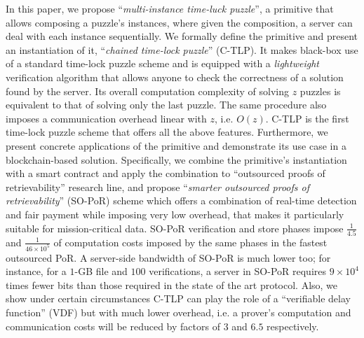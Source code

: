 In this paper, we propose  ``\emph{multi-instance time-luck puzzle}'', a primitive that allows composing a puzzle's instances, where given the composition, a server can deal with each instance sequentially. We formally define the primitive and  present an instantiation of it,  ``\emph{chained  time-lock puzzle}'' (C-TLP).  It makes black-box use of a standard time-lock puzzle scheme and is equipped  with a  \emph{lightweight} verification algorithm that allows anyone to check the correctness of a solution found by the server.    Its overall computation complexity of solving $z$ puzzles is  equivalent to that of solving only the last puzzle. The same procedure also imposes a  communication overhead linear with $z$, i.e. $O(z)$. C-TLP is the first time-lock puzzle scheme that offers all  the above features. Furthermore, we present  concrete applications of the primitive and demonstrate its use case in a blockchain-based solution. Specifically, we combine  the primitive's instantiation with a smart contract and apply the combination  to  ``outsourced proofs of  retrievability'' research line, and   propose ``\emph{smarter  outsourced proofs of retrievability}'' (SO-PoR) scheme which offers  a  combination of real-time detection and fair payment while  imposing very low overhead, that makes it particularly suitable for mission-critical data. SO-PoR verification and store phases impose $\frac{1}{4.5}$  and $\frac{1}{46\times 10^{\scriptscriptstyle 5}}$ of computation costs  imposed by the same phases in the fastest outsourced PoR. A server-side bandwidth of SO-PoR is much lower too;  for instance, for a $1$-GB file and $100$ verifications, a server in SO-PoR requires $9\times 10^{\scriptscriptstyle4}$ times fewer bits  than those required in the state of the art protocol.  Also, we show under certain circumstances  C-TLP can play the role of a ``verifiable delay function'' (VDF) but with much lower overhead, i.e. a prover's computation and communication costs will be reduced by factors of  $3$ and $6.5$ respectively.



